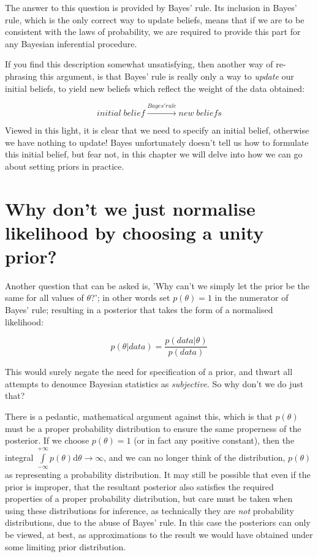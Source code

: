\documentclass[11pt,fullpage]{book}
\begin{document}
The answer to this question is provided by Bayes' rule. Its inclusion in Bayes' rule, which is the only correct way to update beliefs, means that if we are to be consistent with the laws of probability, we are required to provide this part for any Bayesian inferential procedure. 

If you find this description somewhat unsatisfying, then another way of re-phrasing this argument, is that Bayes' rule is really only a way to \textit{update} our initial beliefs, to yield new beliefs which reflect the weight of the data obtained:

\begin{equation}
initial\; belief \xrightarrow{Bayes' rule} new\;beliefs
\end{equation}

Viewed in this light, it is clear that we need to specify an initial belief, otherwise we have nothing to update! Bayes unfortunately doesn't tell us how to formulate this initial belief, but fear not, in this chapter we will delve into how we can go about setting priors in practice.

\section{Why don't we just normalise likelihood by choosing a unity prior?}\label{sec:Prior_unityPrior}
Another question that can be asked is, 'Why can't we simply let the prior be the same for all values of $\theta$?'; in other words set $p(\theta) = 1$ in the numerator of Bayes' rule; resulting in a posterior that takes the form of a normalised likelihood:

\begin{equation}
p(\theta|data) = \frac{p(data|\theta)} {p(data)}
\end{equation}\label{eq:Prior_BayesNormalisedLikelihood}


This would surely negate the need for specification of a prior, and thwart all attempts to denounce Bayesian statistics as \textit{subjective}. So why don't we do just that? 

There is a pedantic, mathematical argument against this, which is that $p(\theta)$ must be a proper probability distribution to ensure the same properness of the posterior. If we choose $p(\theta) = 1$ (or in fact any positive constant), then the integral $\int\limits_{-\infty}^{+\infty}p(\theta)\mathrm{d}\theta\rightarrow\infty$, and we can no longer think of the distribution, $p(\theta)$ as representing a probability distribution. It may still be possible that even if the prior is improper, that the resultant posterior also satisfies the required properties of a proper probability distribution, but care must be taken when using these distributions for inference, as technically they are \textit{not} probability distributions, due to the abuse of Bayes' rule. In this case the posteriors can only be viewed, at best, as approximations to the result we would have obtained under some limiting prior distribution.
\end{document}
